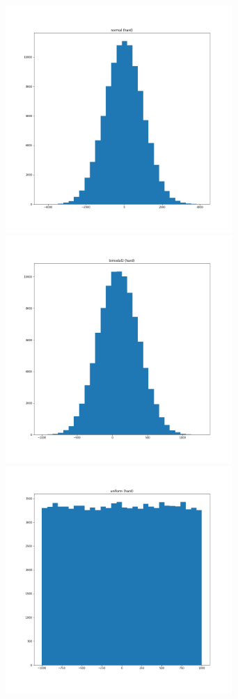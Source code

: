 \documentclass[11pt]{article}
\begin{document}
\includegraphics[width=3.4in]{normal (hard).png}
\includegraphics[width=3.4in]{bimodal2 (hard).png} \\
\includegraphics[width=3.4in]{uniform (hard).png}
\end{document}
